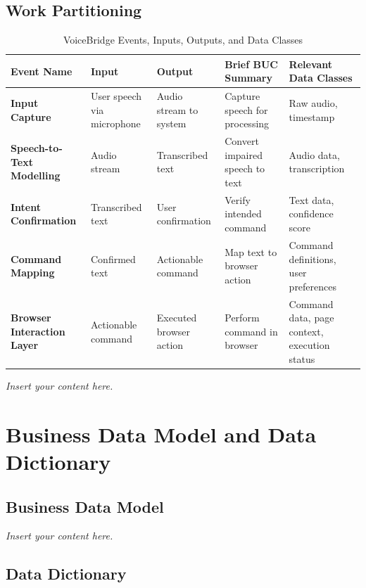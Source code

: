\documentclass[12pt]{article}
\newcommand{\lips}{\textit{Insert your content here.}}
\begin{document}
\subsection{Work Partitioning}
\begin{table}[H]
\centering
\begin{tabularx}{\textwidth}{X X X X X}
\toprule
\textbf{Event Name} & \textbf{Input} & \textbf{Output} & \textbf{Brief BUC Summary} & \textbf{Relevant Data Classes} \\
\midrule
\textbf{Input Capture} & User speech via microphone & Audio stream to system & Capture speech for processing & Raw audio, timestamp \\
\hline
\textbf{Speech-to-Text Modelling} & Audio stream & Transcribed text & Convert impaired speech to text & Audio data, transcription \\
\hline
\textbf{Intent Confirmation} & Transcribed text & User confirmation & Verify intended command & Text data, confidence score \\
\hline
\textbf{Command Mapping} & Confirmed text & Actionable command & Map text to browser action & Command definitions, user preferences \\
\hline
\textbf{Browser Interaction Layer} & Actionable command & Executed browser action & Perform command in browser & Command data, page context, execution status \\
\bottomrule
\end{tabularx}
\caption{VoiceBridge Events, Inputs, Outputs, and Data Classes}
\label{tab:voicebridge-events}
\end{table}

\lips

\section{Business Data Model and Data Dictionary}
\subsection{Business Data Model}
\lips
\subsection{Data Dictionary}
\end{document}
